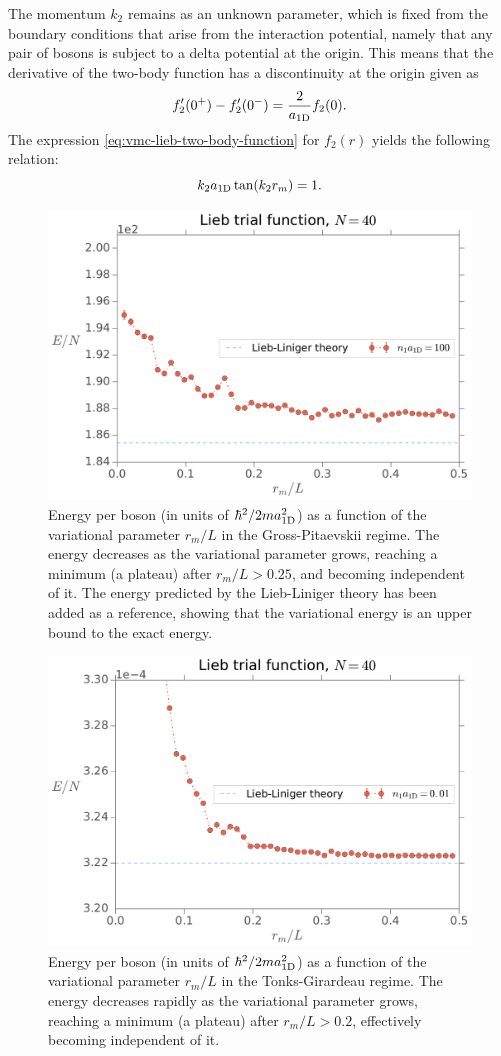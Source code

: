 The momentum $k_2$ remains as an unknown parameter, which is fixed from the
boundary conditions that arise from the interaction potential, namely that any
pair of bosons is subject to a delta potential at the origin. This means that
the derivative of the two-body function has a discontinuity at the origin given
as
%
\begin{equation}
  f_2'(0^{+}) - f_2'(0^{-}) = \frac{2}{a_{ \mathrm{1D} }} f_2(0).
\end{equation}
%
The expression \eqref{eq:vmc-lieb-two-body-function} for $f_2(r)$ yields the
following relation:
%
\begin{equation}
  k_2 a_{ \mathrm{1D} } \tan(k_2 r_m) = 1.
\end{equation}
%
\begin{figure}[t!]
  \centering
  \includegraphics[width=0.75\linewidth]{./figures/lieb_energy-as-rm_n-a1d-100_Nb-40}
  \caption{Energy per boson (in units of $\hbar^2/2ma_{ \mathrm{1D} }^2$) as a function
    of the variational parameter $r_m / L$ in the Gross-Pitaevskii regime. The
    energy decreases as the variational parameter grows, reaching a minimum (a
    plateau) after $r_m / L > 0.25$, and becoming independent of it. The energy
    predicted by the Lieb-Liniger theory has been added as a reference, showing
    that the variational energy is an upper bound to the exact energy. }
  \label{fig:lieb-energy-as-rm-n-a1d-100-nb-40}
\end{figure}
%
\begin{figure}[h!]
  \centering
  \includegraphics[width=0.75\linewidth]{./figures/lieb_energy-as-rm_n-a1d-0-dot-01_Nb-40}
  \caption{Energy per boson (in units of $\hbar^2/2ma_{ \mathrm{1D} }^2$) as a function
    of the variational parameter $r_m / L$ in the Tonks-Girardeau regime. The
    energy decreases rapidly as the variational parameter grows, reaching a
    minimum (a plateau) after $r_m / L > 0.2$, effectively becoming independent
    of it. }
  \label{fig:lieb-energy-as-rm-n-a1d-0-dot-01-nb-40}
\end{figure}
